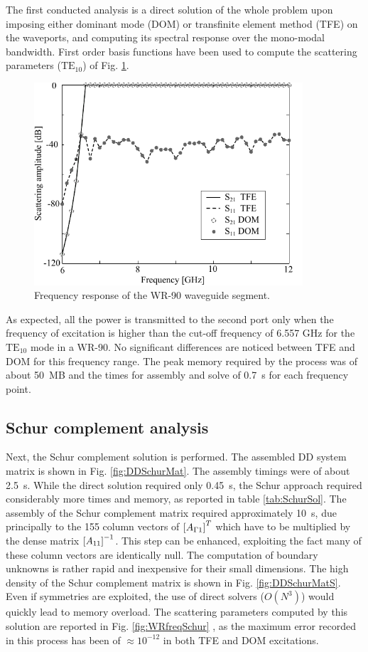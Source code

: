 The first conducted analysis is a direct solution of the whole problem upon imposing either dominant mode (DOM) or transfinite element method (TFE) on the waveports, and computing its spectral response over the mono-modal bandwidth. First order basis functions have been used to compute the scattering parameters ($\mathrm{TE}_{10}$) of Fig. \ref{fig:WRfreq}.

\begin{figure}[h!]
\centering
\includegraphics[width=10cm]{WRfreq}
\caption{Frequency response of the WR-90 waveguide segment.}
\label{fig:WRfreq}
\end{figure}

As expected, all the power is transmitted to the second port only when the frequency of excitation is higher than the cut-off frequency of 6.557 GHz for the $\mathrm{TE}_{10}$ mode in a WR-90. No significant differences are noticed between TFE and DOM for this frequency range. The peak memory required by the process was of about 50~MB and the times for assembly and solve of 0.7~s for each frequency point.

\subsection{Schur complement analysis}

Next, the Schur complement solution is performed. The assembled DD system matrix is shown in Fig. \ref{fig:DDSchurMat}. The assembly timings were of about 2.5~s. While the direct solution required only 0.45~s, the Schur approach required considerably more times and memory, as reported in table \ref{tab:SchurSol}. The assembly of the Schur complement matrix required approximately 10~s, due principally to the 155 column vectors of $\left[A_{\Gamma 1}\right]^T$ which have to be multiplied by the dense matrix $\left[A_{11}\right]^{-1}$. This step can be enhanced, exploiting the fact many of these column vectors are identically null. The computation of boundary unknowns is rather rapid and inexpensive for their small dimensions. The high density of the Schur complement matrix is shown in Fig. \ref{fig:DDSchurMatS}. Even if symmetries are exploited, the use of direct solvers ($O(N^3)$) would quickly lead to memory overload. The scattering parameters computed by this solution are reported in Fig. \ref{fig:WRfreqSchur} , as the maximum error recorded in this process has been of $\approx 10^{-12}$ in both TFE and DOM excitations.

